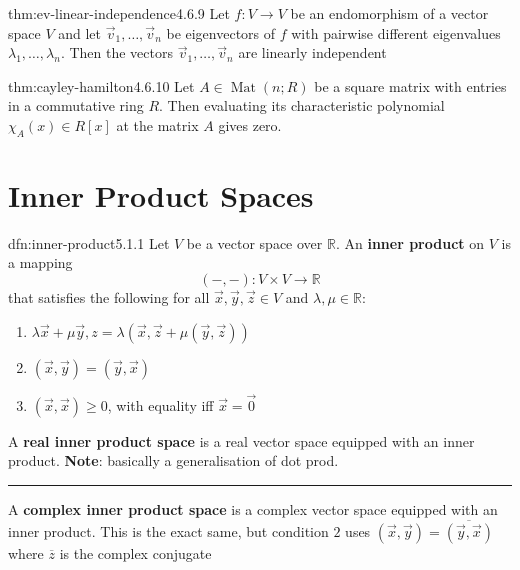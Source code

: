 \documentclass[landscape, 8pt]{extarticle}
\DeclareMathOperator{\Mat}{Mat}
\begin{document}
\begin{multicols}{3}
\vspace{-5pt}
\begin{thm}{thm:ev-linear-independence}{4.6.9}
    Let $f : V\to V$ be an endomorphism of a vector space $V$ and let $\vec{v}_{1},\dots,\vec{v}_{n}$ be eigenvectors of $f$ with pairwise different eigenvalues $\lambda_{1},\dots,\lambda_{n}$. Then the vectors $\vec{v}_{1},\dots,\vec{v}_{n}$ are linearly independent
\end{thm}

\vspace{-5pt}
\begin{thm}{thm:cayley-hamilton}{4.6.10}
    Let $A\in \Mat(n;R)$ be a square matrix with entries in a commutative ring $R$. Then evaluating its characteristic polynomial $\chi_{A}(x)\in R[x]$ at the matrix $A$ gives zero.
\end{thm}

\vspace{-10pt}
\section{Inner Product Spaces}

\begin{dfn}{dfn:inner-product}{5.1.1}
    Let $V$ be a vector space over $\mathbb{R}$. An \textbf{inner product} on $V$ is a mapping
    \[(- , - ) : V \times V \to \mathbb{R}\]
    that satisfies the following for all $\vec{x}, \vec{y}, \vec{z}\in V$ and $\lambda,\mu\in \mathbb{R}$:
    \begin{enumerate}
        \setlength\itemsep{0em}
        \item $\lambda\vec{x}+\mu\vec{y},z = \lambda(\vec{x},\vec{z} + \mu(\vec{y},\vec{z}))$
        \item $(\vec{x},\vec{y}) = (\vec{y}, \vec{x})$
        \item $(\vec{x},\vec{x}) \ge 0$, with equality iff $\vec{x} = \vec{0}$
    \end{enumerate}
    A \textbf{real inner product space} is a real vector space equipped with an inner product. \textbf{Note}: basically a generalisation of dot prod.

    \noindent\rule{\textwidth}{0.2pt}
    A \textbf{complex inner product space} is a complex vector space equipped with an inner product. This is the exact same, but condition $2$ uses $(\vec{x},\vec{y}) = \overline{(\vec{y}, \vec{x})}$ where $\overline{z}$ is the complex conjugate
\end{dfn}


\end{multicols}
\end{document}

